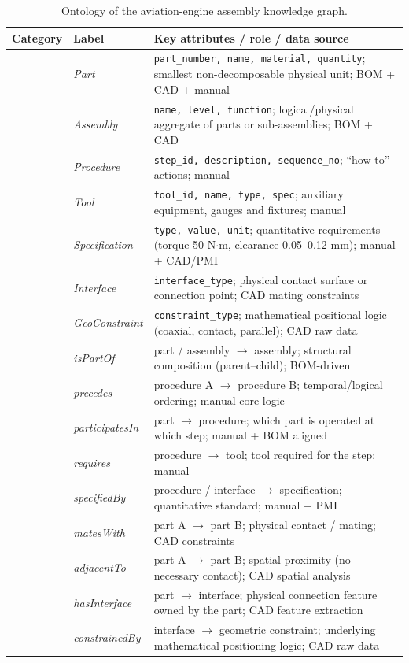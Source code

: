 \documentclass[applsci,article,submit,pdftex,moreauthors]{Definitions/mdpi}
\begin{document}
\begin{table}[H]
\caption{Ontology of the aviation-engine assembly knowledge graph.\label{tab:ontology}}
\begin{tabularx}{\textwidth}{p{2.0cm}p{2.4cm}X}
\toprule
\textbf{Category} & \textbf{Label} & \textbf{Key attributes / role / data source}\\
\midrule
{}
& \textit{Part}            & \texttt{part\_number, name, material, quantity}; smallest non-decomposable physical unit; BOM + CAD + manual\\
& \textit{Assembly}        & \texttt{name, level, function}; logical/physical aggregate of parts or sub-assemblies; BOM + CAD\\
& \textit{Procedure}       & \texttt{step\_id, description, sequence\_no}; ``how-to'' actions; manual\\
& \textit{Tool}            & \texttt{tool\_id, name, type, spec}; auxiliary equipment, gauges and fixtures; manual\\
& \textit{Specification}   & \texttt{type, value, unit}; quantitative requirements (torque 50 N$\cdot$m, clearance 0.05--0.12 mm); manual + CAD/PMI\\
& \textit{Interface}       & \texttt{interface\_type}; physical contact surface or connection point; CAD mating constraints\\
& \textit{GeoConstraint}   & \texttt{constraint\_type}; mathematical positional logic (coaxial, contact, parallel); CAD raw data\\
\midrule
{}
& \textit{isPartOf}        & part / assembly $\rightarrow$ assembly; structural composition (parent--child); BOM-driven\\
& \textit{precedes}        & procedure A $\rightarrow$ procedure B; temporal/logical ordering; manual core logic\\
& \textit{participatesIn}  & part $\rightarrow$ procedure; which part is operated at which step; manual + BOM aligned\\
& \textit{requires}        & procedure $\rightarrow$ tool; tool required for the step; manual\\
& \textit{specifiedBy}     & procedure / interface $\rightarrow$ specification; quantitative standard; manual + PMI\\
& \textit{matesWith}       & part A $\rightarrow$ part B; physical contact / mating; CAD constraints\\
& \textit{adjacentTo}      & part A $\rightarrow$ part B; spatial proximity (no necessary contact); CAD spatial analysis\\
& \textit{hasInterface}    & part $\rightarrow$ interface; physical connection feature owned by the part; CAD feature extraction\\
& \textit{constrainedBy}   & interface $\rightarrow$ geometric constraint; underlying mathematical positioning logic; CAD raw data\\
\bottomrule
\end{tabularx}
\end{table}
\end{document}
